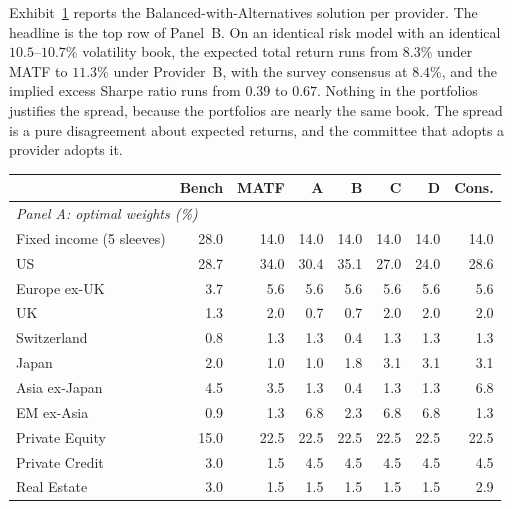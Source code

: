 \documentclass[pdftex,12pt,a4paper]{article}
\begin{document}
Exhibit~\ref{tab:provider_saa} reports the Balanced-with-Alternatives solution per provider. The headline is the top row of Panel~B. On an identical risk model with an identical $10.5$--$10.7\%$ volatility book, the expected total return runs from $8.3\%$ under MATF to $11.3\%$ under Provider~B, with the survey consensus at $8.4\%$, and the implied excess Sharpe ratio runs from $0.39$ to $0.67$. Nothing in the portfolios justifies the spread, because the portfolios are nearly the same book. The spread is a pure disagreement about expected returns, and the committee that adopts a provider adopts it.

\begin{table}[H]
	\label{tab:provider_saa}\vspace*{-0.5\baselineskip}
	\begin{center}
		\footnotesize
		\begin{tabular}{l rrrrrrr}
			\toprule
			& \textbf{Bench} & \textbf{MATF} & \textbf{A} & \textbf{B} & \textbf{C} & \textbf{D} & \textbf{Cons.} \\
			\midrule
			\multicolumn{8}{l}{\textit{Panel A: optimal weights (\%)}} \\
			Fixed income (5 sleeves)  & 28.0 & 14.0 & 14.0 & 14.0 & 14.0 & 14.0 & 14.0 \\
			US                        & 28.7 & 34.0 & 30.4 & 35.1 & 27.0 & 24.0 & 28.6 \\
			Europe ex-UK              & 3.7  & 5.6  & 5.6  & 5.6  & 5.6  & 5.6  & 5.6 \\
			UK                        & 1.3  & 2.0  & 0.7  & 0.7  & 2.0  & 2.0  & 2.0 \\
			Switzerland               & 0.8  & 1.3  & 1.3  & 0.4  & 1.3  & 1.3  & 1.3 \\
			Japan                     & 2.0  & 1.0  & 1.0  & 1.8  & 3.1  & 3.1  & 3.1 \\
			Asia ex-Japan             & 4.5  & 3.5  & 1.3  & 0.4  & 1.3  & 1.3  & 6.8 \\
			EM ex-Asia                & 0.9  & 1.3  & 6.8  & 2.3  & 6.8  & 6.8  & 1.3 \\
			Private Equity            & 15.0 & 22.5 & 22.5 & 22.5 & 22.5 & 22.5 & 22.5 \\
			Private Credit            & 3.0  & 1.5  & 4.5  & 4.5  & 4.5  & 4.5  & 4.5 \\
			Real Estate               & 3.0  & 1.5  & 1.5  & 1.5  & 1.5  & 1.5  & 2.9 \\

\end{tabular}
\end{center}
\end{table}
\end{document}
